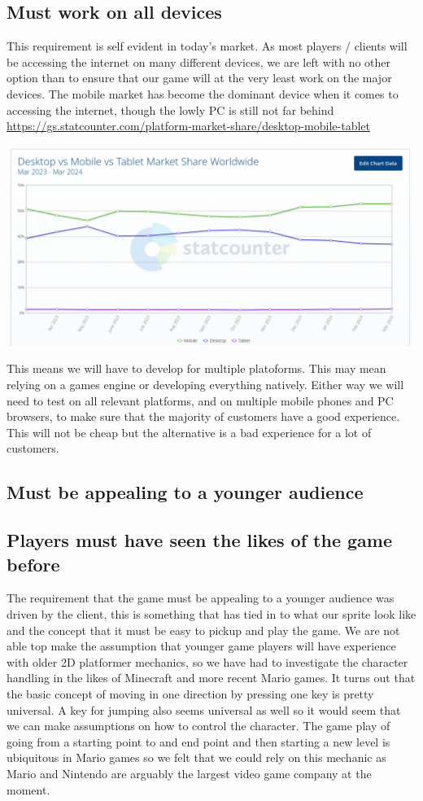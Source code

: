 \documentclass{article}
\begin{document}
\subsection{ Must work on all devices }
This requirement is self evident in today's market. As most players / clients will be accessing the internet on many different devices, we are left with no other option than to ensure that our game will at the very least work on the major devices.
The mobile market has become the dominant device when it comes to accessing the internet, though the lowly PC is still not far behind \url{https://gs.statcounter.com/platform-market-share/desktop-mobile-tablet}

\includegraphics[scale=0.35]{MobileVsPC}

This means we will have to develop for multiple platoforms. This may mean relying on a games engine or developing everything natively. Either way we will need to test on all relevant platforms, and on multiple mobile phones and PC browsers, to make sure that the majority of customers have a good experience. This will not be cheap but the alternative is a bad experience for a lot of customers.

\subsection{ Must be appealing to a younger audience }
\subsection{ Players must have seen the likes of the game before }
The requirement that the game must be appealing to a younger audience was driven by the client, this is something that has tied in to what our sprite look like and the concept that it must be easy to pickup and play the game.
We are not able top make the assumption that younger game players will have experience with older 2D platformer mechanics, so we have had to investigate the character handling in the likes of Minecraft and more recent Mario games. It turns out that the basic concept of moving in one direction by pressing one key is pretty universal. A key for jumping also seems universal as well so it would seem that we can make assumptions on how to control the character.
The game play of going from a starting point to and end point and then starting a new level is ubiquitous in Mario games so we felt that we could rely on this mechanic as Mario and Nintendo are arguably the largest video game company at the moment.
\end{document}
